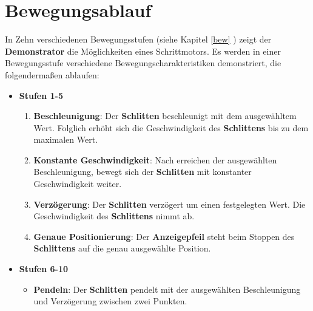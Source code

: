 %
%

\chapter{Bewegungsablauf}

In Zehn verschiedenen Bewegungsstufen (siehe Kapitel \ref{bew} ) zeigt der \textbf{Demonstrator} die Möglichkeiten eines Schrittmotors. Es werden in einer Bewegungsstufe verschiedene Bewegungscharakteristiken demonstriert, die folgendermaßen ablaufen:  

	\begin{itemize}
		\item \textbf{Stufen 1-5}
		\begin{enumerate}
			\item\textbf{Beschleunigung}: Der \textbf{Schlitten} beschleunigt mit dem ausgewähltem Wert. Folglich erhöht sich die Geschwindigkeit des \textbf{Schlittens} bis zu dem maximalen Wert. 
			\item\textbf{Konstante Geschwindigkeit}: Nach erreichen der ausgewählten Beschleunigung, bewegt sich der \textbf{Schlitten} mit konstanter Geschwindigkeit weiter.
			\item\textbf{Verzögerung}: Der \textbf{Schlitten} verzögert um einen festgelegten Wert. Die Geschwindigkeit des \textbf{Schlittens} nimmt ab.
			\item\textbf{Genaue Positionierung}: Der \textbf{Anzeigepfeil} steht beim Stoppen des \textbf{Schlittens} auf die genau ausgewählte Position.
		\end{enumerate}
	\end{itemize}
	\begin{itemize}
		\item \textbf{Stufen 6-10}
		\begin{itemize}
			\item\textbf{Pendeln}: Der \textbf{Schlitten} pendelt mit der ausgewählten Beschleunigung und Verzögerung zwischen zwei Punkten.
		\end{itemize}
	\end{itemize}			
	
